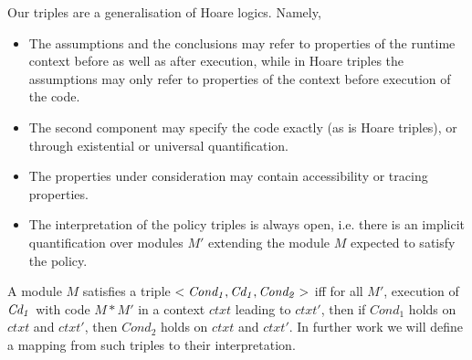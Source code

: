 Our triples   are a generalisation of Hoare logics. Namely,
\begin{itemize}
\item The assumptions and the conclusions may refer to properties of the runtime context before as well as after execution, while in Hoare triples the assumptions may  only refer to properties of the context before
execution of the code.
\item The second component may specify the code exactly (as is Hoare triples), or through existential or universal quantification.
\item The properties under consideration may contain accessibility or tracing properties.
\item The interpretation of the policy triples is always open, i.e. there is an implicit quantification over modules $M'$ extending the module $M$ expected to satisfy the policy.
\end{itemize}

 A module $M$ satisfies   a triple  ${\it <Cond_1, Cd_1, Cond_2>}$ iff for all $M'$, execution of ${\it{Cd_1}}$ with code $M*M'$ in a context $ctxt$  leading to $ctxt'$, then if $Cond_1$ holds on $ctxt$ and $ctxt'$, then $Cond_2$ holds on $ctxt$ and $ctxt'$. In further work we will define a mapping from such triples to their interpretation.


